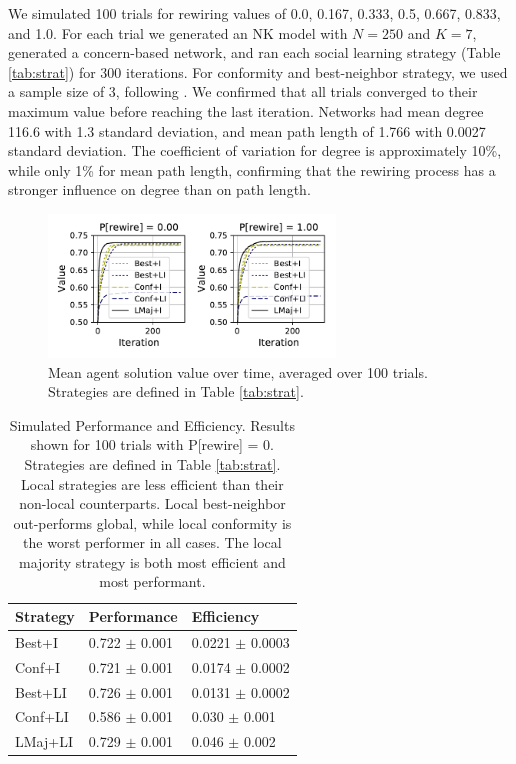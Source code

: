 \documentclass[letterpaper,twocolumn,10pt]{article}
\newcommand{\+}{\phantom{-}}
\begin{document}
We simulated 100 trials for rewiring values of 0.0, 0.167, 0.333, 0.5, 0.667, 0.833, and 1.0.
For each trial we generated an NK model with $N=250$ and $K=7$,
generated a concern-based network, and ran each social learning strategy
(Table \ref{tab:strat}) for 300 iterations.
For conformity and best-neighbor strategy, we used a sample size of 3, following
\cite{barkoczi_social_2016}.
We confirmed that all trials converged to their maximum value before reaching
the last iteration.
Networks had mean degree 116.6 with 1.3 standard deviation,
and mean path length of 1.766 with 0.0027 standard deviation.
The coefficient of variation for degree is approximately 10\%,
while only 1\% for mean path length, confirming that the rewiring process has a stronger influence
on degree than on path length.

\begin{figure}[t!]
\centering
\includegraphics[width=3in,height=1.5in]{fig-val-iter.pdf}
\caption{
Mean agent solution value over time, averaged over 100 trials.
Strategies are defined in Table \ref{tab:strat}.
\label{fig:val-iter}
}
\end{figure}

\begin{table}
\small
\centering
\begin{tabular}{lll}
Strategy & Performance & Efficiency\\
\hline
Best+I  & 0.722 $\pm$ 0.001 & 0.0221 $\pm$ 0.0003 \\
Conf+I  & 0.721 $\pm$ 0.001 & 0.0174 $\pm$ 0.0002 \\
Best+LI & 0.726 $\pm$ 0.001 & 0.0131 $\pm$ 0.0002 \\
Conf+LI & 0.586 $\pm$ 0.001 & 0.030 $\pm$ 0.001 \\
LMaj+LI & 0.729 $\pm$ 0.001 & 0.046 $\pm$ 0.002 \\
\hline
\end{tabular}
\caption{
Simulated Performance and Efficiency.
Results shown for 100 trials with P[rewire] = 0.
Strategies are defined in Table \ref{tab:strat}.
Local strategies are less efficient than their non-local counterparts.
Local best-neighbor out-performs global,
while local conformity is the worst performer in all cases.
The local majority strategy is both most efficient and most performant.
\label{tab:sim-eff-perf}
}
\end{table}
\end{document}
